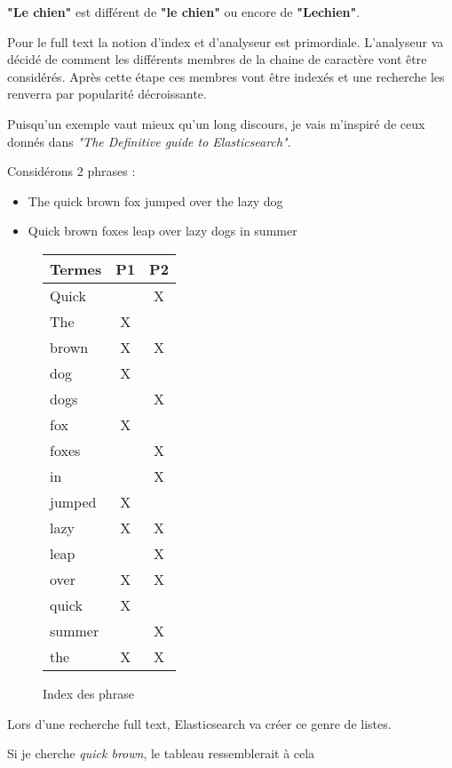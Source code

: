 \textbf{"Le chien"} est différent de \textbf{"le chien"} ou encore de \textbf{"Lechien"}.

Pour le full text la notion d'index et d'analyseur est primordiale. L'analyseur va
décidé de comment les différents membres de la chaine de caractère vont être considérés.
Après cette étape ces membres vont être indexés et une recherche les renverra par 
popularité décroissante.

Puisqu'un exemple vaut mieux qu'un long discours, je vais m'inspiré de ceux donnés
dans \textit{"The Definitive guide to Elasticsearch"}.


Considérons 2 phrases :
\begin{itemize}
    \item The quick brown fox jumped over the lazy dog
    \item Quick brown foxes leap over lazy dogs in summer
\end{itemize}

\begin{figure}[H]
\center
\begin{tabular}{|l||c|c|}
\hline
\textbf{Termes}   & \textbf{P1}    & \textbf{P2}\\ \hline  
Quick   &       &  X\\ \hline  
The     &   X   &   \\ \hline
brown   &   X   &  X\\ \hline
dog     &   X   &   \\ \hline
dogs    &       &  X\\ \hline
fox     &   X   &   \\ \hline
foxes   &       &  X\\ \hline
in      &       &  X\\ \hline
jumped  &   X   &   \\ \hline
lazy    &   X   &  X\\ \hline
leap    &       &  X\\ \hline
over    &   X   &  X\\ \hline
quick   &   X   &   \\ \hline
summer  &       &  X\\ \hline
the     &   X   &  X\\ \hline 
\end{tabular}
\caption{Index des phrase}
\end{figure}
Lors d'une recherche full text, Elasticsearch va créer ce genre de listes.

Si je cherche \emph{quick brown}, le tableau ressemblerait à cela 


